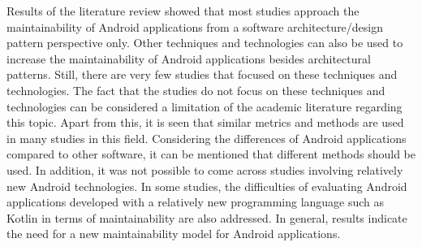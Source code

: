 Results of the literature review showed that most studies approach the maintainability of Android applications from a software architecture/design pattern perspective only. Other techniques and technologies can also be used to increase the maintainability of Android applications besides architectural patterns. Still, there are very few studies that focused on these techniques and technologies. The fact that the studies do not focus on these techniques and technologies can be considered a limitation of the academic literature regarding this topic. Apart from this, it is seen that similar metrics and methods are used in many studies in this field. Considering the differences of Android applications compared to other software, it can be mentioned that different methods should be used. In addition, it was not possible to come across studies involving relatively new Android technologies. In some studies, the difficulties of evaluating Android applications developed with a relatively new programming language such as Kotlin in terms of maintainability are also addressed. In general, results indicate the need for a new maintainability model for Android applications.